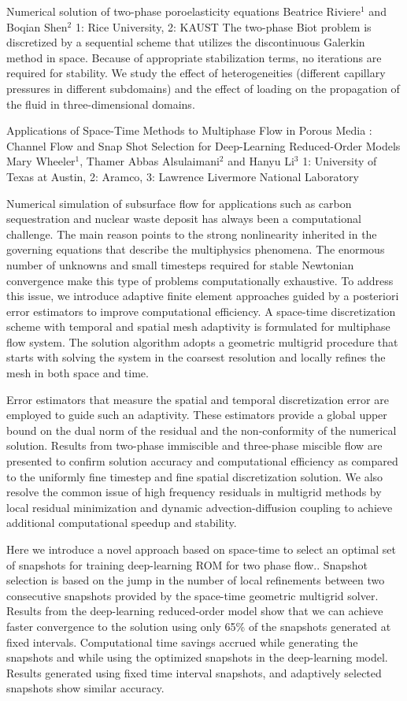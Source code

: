 \vspace{1.5ex}
\abs
{Numerical solution of two-phase poroelasticity equations}
{Beatrice Riviere$^{1}$ and Boqian Shen$^{2}$}
{1: Rice University, 2: KAUST}
{The two-phase Biot problem is discretized by a sequential scheme that utilizes the discontinuous Galerkin method in space. Because of appropriate stabilization terms, no iterations are required for stability. We study the effect of heterogeneities (different capillary pressures in different subdomains) and the effect of loading on the propagation of the fluid in three-dimensional domains.}


\vspace{1.5ex}
\abs
{Applications of Space-Time Methods to Multiphase Flow in Porous Media  :  Channel Flow and  Snap Shot Selection for Deep-Learning Reduced-Order Models }
{Mary Wheeler$^{1}$, Thamer  Abbas Alsulaimani$^{2}$ and Hanyu Li$^{3}$}
{1: University of Texas at Austin, 2: Aramco, 3: Lawrence Livermore National Laboratory}
{Numerical simulation of subsurface flow for applications such as carbon sequestration and nuclear waste deposit has always been a computational challenge. The main reason points to the strong nonlinearity inherited in the governing equations that describe the multiphysics phenomena. The enormous number of unknowns and small timesteps required for stable Newtonian convergence make this type of problems computationally exhaustive. To address this issue, we introduce adaptive finite element approaches guided by a posteriori error estimators to improve computational efficiency. A space-time discretization scheme with temporal and spatial mesh adaptivity is formulated for multiphase flow system. The solution algorithm adopts a geometric multigrid procedure that starts with solving the system in the coarsest resolution and locally refines the mesh in both space and time. 

Error estimators that measure the spatial and temporal discretization error are employed to guide such an adaptivity. These estimators provide a global upper bound on the dual norm of the residual and the non-conformity of the numerical solution. Results from two-phase immiscible and three-phase miscible flow are presented to confirm solution accuracy and computational efficiency as compared to the uniformly fine timestep and fine spatial discretization solution. We also resolve the common issue of high frequency residuals in multigrid methods by local residual minimization and dynamic advection-diffusion coupling to achieve additional computational speedup and stability. 

Here we introduce a novel approach based on space-time to select an optimal set of snapshots for training  deep-learning ROM for two phase flow.. Snapshot selection is based on the jump in the number of local refinements between two consecutive snapshots provided by the space-time  geometric multigrid solver. Results from the deep-learning reduced-order model show that we can achieve faster convergence to the solution using only 65\% of the snapshots generated at fixed intervals. Computational time savings accrued while generating the snapshots and while using the optimized snapshots in the deep-learning model. Results generated using fixed time interval snapshots, and adaptively selected snapshots show similar accuracy.}